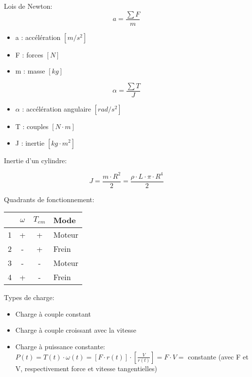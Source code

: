 \documentclass[12pt, twocolumn]{article}
\begin{document}
				Lois de Newton:
				\[a = \frac{\sum F}{m}\]
				
				\begin{itemize}
					\item a : accélération $[m/s^2]$
					\item F : forces $[N]$
					\item m : masse $[kg]$
				\end{itemize}
		
				\[\alpha = \frac{\sum T}{J} \]
		
				\begin{itemize} 
					\item $\alpha$ : accélération angulaire $[rad/s^2]$
					\item T : couples $[N \cdot m]$
					\item J : inertie $[kg \cdot m^2]$
				\end{itemize}
		
				Inertie d'un cylindre:
				
				\[ J = \frac{m \cdot R^2}{2} = \frac{\rho \cdot L \cdot \pi \cdot R^4}{2} \]
				
				Quadrants de fonctionnement:
				
				\begin{table}[h!]
				\begin{tabular}{|c|c|c|l|}
				\hline
					& $\omega$ & $T_{em}$ & Mode   \\ \hline
				1 & +        & +        & Moteur \\ \hline
				2 & -        & +        & Frein  \\ \hline
				3 & -        & -        & Moteur \\ \hline
				4 & +        & -        & Frein  \\ \hline
				\end{tabular}
				\centering
				\end{table}
				
				Types de charge:
				
				\begin{itemize}
					\item Charge à couple constant
					\item Charge à couple croissant avec la vitesse
					\item Charge à puissance constante: $P(t)=T(t) \cdot \omega(t)=[F \cdot r(t)] \cdot\left[\frac{V}{r(t)}\right]=F \cdot V=$ constante (avec F et V, respectivement force et vitesse tangentielles)
				\end{itemize}
				
\end{document}
